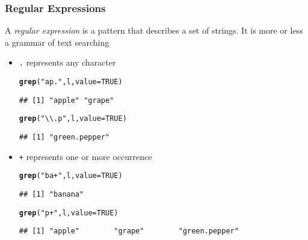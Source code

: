 \documentclass[paper=screen,mathserif]{beamer}\usepackage[]{graphicx}\usepackage[]{color}
\makeatletter
\newcommand{\hlnum}[1]{\textcolor[rgb]{0.686,0.059,0.569}{#1}}%
\newcommand{\hlstr}[1]{\textcolor[rgb]{0.192,0.494,0.8}{#1}}%
\newcommand{\hlstd}[1]{\textcolor[rgb]{0.345,0.345,0.345}{#1}}%
\newcommand{\hlkwc}[1]{\textcolor[rgb]{0.333,0.667,0.333}{#1}}%
\newcommand{\hlkwd}[1]{\textcolor[rgb]{0.737,0.353,0.396}{\textbf{#1}}}%
\newenvironment{kframe}{%
 \def\at@end@of@kframe{}%
 \ifinner\ifhmode%
  \def\at@end@of@kframe{\end{minipage}}%
  \begin{minipage}{\columnwidth}%
 \fi\fi%
 \def\FrameCommand##1{\hskip\@totalleftmargin \hskip-\fboxsep
 \colorbox{shadecolor}{##1}\hskip-\fboxsep
     \hskip-\linewidth \hskip-\@totalleftmargin \hskip\columnwidth}%
 \MakeFramed {\advance\hsize-\width
   \@totalleftmargin\z@ \linewidth\hsize
   \@setminipage}}%
 {\par\unskip\endMakeFramed%
 \at@end@of@kframe}
\newenvironment{knitrout}{}{} %
\newcommand{\ft}[1]{\frametitle{#1}}
\newenvironment{xframe}[1][]
{\begin{frame}[fragile,environment=xframe]
    \frametitle{#1}}
  {\end{frame}}
\makeatother
\begin{document}
\begin{xframe}
  \ft{Regular Expressions}
  
  A {\em regular expression} is a pattern that describes a set of
  strings. It is more or less a grammar of text searching
  
  \begin{itemize}
  \item {\tt .} represents any character
\begin{knitrout}\scriptsize
{}\color{fgcolor}\begin{kframe}
\begin{alltt}
\hlkwd{grep}\hlstd{(}\hlstr{"ap."}\hlstd{, l,} \hlkwc{value} \hlstd{=} \hlnum{TRUE}\hlstd{)}
\end{alltt}
\begin{verbatim}
## [1] "apple" "grape"
\end{verbatim}
\begin{alltt}
\hlkwd{grep}\hlstd{(}\hlstr{"\textbackslash{}\textbackslash{}.p"}\hlstd{, l,} \hlkwc{value} \hlstd{=} \hlnum{TRUE}\hlstd{)}
\end{alltt}
\begin{verbatim}
## [1] "green.pepper"
\end{verbatim}
\end{kframe}
\end{knitrout}
\item {\tt +} represents one or more occurrence
\begin{knitrout}\scriptsize
{}\color{fgcolor}\begin{kframe}
\begin{alltt}
\hlkwd{grep}\hlstd{(}\hlstr{"ba+"}\hlstd{, l,} \hlkwc{value} \hlstd{=} \hlnum{TRUE}\hlstd{)}
\end{alltt}
\begin{verbatim}
## [1] "banana"
\end{verbatim}
\begin{alltt}
\hlkwd{grep}\hlstd{(}\hlstr{"p+"}\hlstd{, l,} \hlkwc{value} \hlstd{=} \hlnum{TRUE}\hlstd{)}
\end{alltt}
\begin{verbatim}
## [1] "apple"        "grape"        "green.pepper"
\end{verbatim}
\end{kframe}
\end{knitrout}

  \end{itemize}
\end{xframe}
\end{document}
